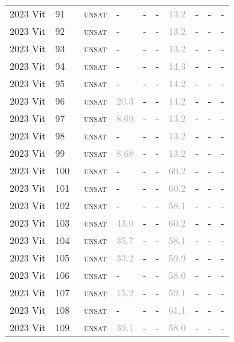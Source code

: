 \begin{center}
{\begin{longtable}{@{}llllllllll@{}}
2023 Vit & 91 & ~\textsc{unsat} & - & - & - & \textcolor{darkgray}{13.2} & - & - & - \\
2023 Vit & 92 & ~\textsc{unsat} & - & - & - & \textcolor{darkgray}{13.2} & - & - & - \\
2023 Vit & 93 & ~\textsc{unsat} & - & - & - & \textcolor{darkgray}{13.2} & - & - & - \\
2023 Vit & 94 & ~\textsc{unsat} & - & - & - & \textcolor{darkgray}{14.3} & - & - & - \\
2023 Vit & 95 & ~\textsc{unsat} & - & - & - & \textcolor{darkgray}{14.2} & - & - & - \\
2023 Vit & 96 & ~\textsc{unsat} & \textcolor{darkgray}{20.3} & - & - & \textcolor{darkgray}{14.2} & - & - & - \\
2023 Vit & 97 & ~\textsc{unsat} & \textcolor{darkgray}{8.69} & - & - & \textcolor{darkgray}{13.2} & - & - & - \\
2023 Vit & 98 & ~\textsc{unsat} & - & - & - & \textcolor{darkgray}{13.2} & - & - & - \\
2023 Vit & 99 & ~\textsc{unsat} & \textcolor{darkgray}{8.68} & - & - & \textcolor{darkgray}{13.2} & - & - & - \\
2023 Vit & 100 & ~\textsc{unsat} & - & - & - & \textcolor{darkgray}{60.2} & - & - & - \\
2023 Vit & 101 & ~\textsc{unsat} & - & - & - & \textcolor{darkgray}{60.2} & - & - & - \\
2023 Vit & 102 & ~\textsc{unsat} & - & - & - & \textcolor{darkgray}{58.1} & - & - & - \\
2023 Vit & 103 & ~\textsc{unsat} & \textcolor{darkgray}{43.0} & - & - & \textcolor{darkgray}{60.2} & - & - & - \\
2023 Vit & 104 & ~\textsc{unsat} & \textcolor{darkgray}{35.7} & - & - & \textcolor{darkgray}{58.1} & - & - & - \\
2023 Vit & 105 & ~\textsc{unsat} & \textcolor{darkgray}{33.2} & - & - & \textcolor{darkgray}{59.9} & - & - & - \\
2023 Vit & 106 & ~\textsc{unsat} & - & - & - & \textcolor{darkgray}{58.0} & - & - & - \\
2023 Vit & 107 & ~\textsc{unsat} & \textcolor{darkgray}{15.2} & - & - & \textcolor{darkgray}{59.1} & - & - & - \\
2023 Vit & 108 & ~\textsc{unsat} & - & - & - & \textcolor{darkgray}{61.1} & - & - & - \\
2023 Vit & 109 & ~\textsc{unsat} & \textcolor{darkgray}{39.1} & - & - & \textcolor{darkgray}{58.0} & - & - & - \\

\end{longtable}}
\end{center}
